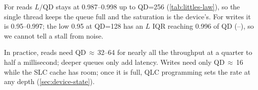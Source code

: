 For reads $L/\text{QD}$ stays at 0.987--0.998 up to QD=256 (\cref{tab:littles-law}), so the single
 thread keeps the queue full and the saturation is the device's. For writes it is
0.95--0.997; the low 0.95 at QD=128 has an $L$ IQR reaching 0.996 of QD
(--),
so we cannot tell a stall from noise.

In practice, reads need QD\,$\approx$\,32--64 for nearly all the throughput at a quarter to half a
millisecond; deeper queues only add latency. Writes need only QD\,$\approx$\,16 while the SLC cache has
room; once it is full, QLC programming sets the rate at any depth (\cref{sec:device-state}).
